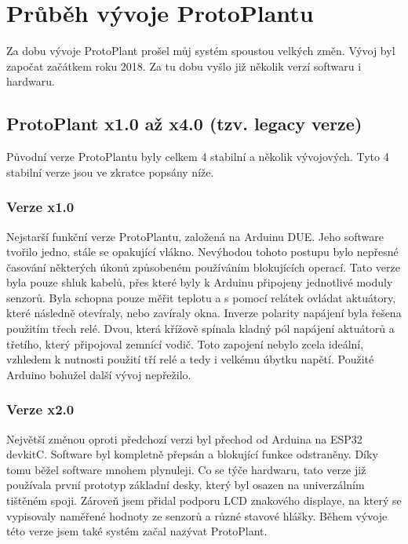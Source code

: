 \chapter{Průběh vývoje ProtoPlantu}
Za dobu vývoje ProtoPlant prošel můj systém spoustou velkých změn.
Vývoj byl započat začátkem roku 2018.
Za tu dobu vyšlo již několik verzí softwaru i hardwaru.

\section{ProtoPlant x1.0 až x4.0 (tzv. legacy verze)}
Původní verze ProtoPlantu byly celkem 4 stabilní a několik vývojových.
Tyto 4 stabilní verze jsou ve zkratce popsány níže.

\subsection{Verze x1.0}
Nejstarší funkční verze ProtoPlantu, založená na Arduinu DUE. 
Jeho software tvořilo jedno, stále se opakující vlákno.
Nevýhodou tohoto postupu bylo nepřesné časování některých úkonů způsobeném používáním blokujících operací.
Tato verze byla pouze shluk kabelů, přes které byly k Arduinu připojeny jednotlivé moduly senzorů.
Byla schopna pouze měřit teplotu a s pomocí relátek ovládat aktuátory, které následně otevíraly, nebo zavíraly okna.
Inverze polarity napájení byla řešena použitím třech relé.
Dvou, která křížově spínala kladný pól napájení aktuátorů a třetího, který připojoval zemnící vodič.
Toto zapojení nebylo zcela ideální, vzhledem k nutnosti použití tří relé a tedy i velkému úbytku napětí.
Použité Arduino bohužel další vývoj nepřežilo.

\subsection{Verze x2.0}
Největší změnou oproti předchozí verzi byl přechod od Arduina na ESP32 devkitC.
Software byl kompletně přepsán a blokující funkce odstraněny.
Díky tomu běžel software mnohem plynuleji.
Co se týče hardwaru, tato verze již používala první prototyp základní desky, který byl osazen na univerzálním tištěném spoji.
Zároveň jsem přidal podporu LCD znakového displaye, na který se vypisovaly naměřené hodnoty ze senzorů a různé stavové hlášky.
Během vývoje této verze jsem také systém začal nazývat ProtoPlant.

